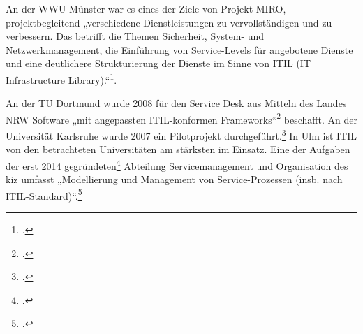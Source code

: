 An der WWU Münster war es eines der Ziele von Projekt MIRO, projektbegleitend „verschiedene Dienstleistungen zu vervollständigen und zu verbessern. Das betrifft die Themen Sicherheit, System- und Netzwerkmanagement, die Einführung von Service-Levels für angebotene Dienste und eine deutlichere Strukturierung der Dienste im Sinne von ITIL (IT Infrastructure Library).“\footcite{unimunster_projekt_miro_2015}.

An der TU Dortmund wurde 2008 für den Service Desk aus Mitteln des Landes NRW Software „mit angepassten ITIL-konformen Frameworks“\footcite{tudortmund_itmc_service_desk_2013} beschafft.
An der Universität Karlsruhe wurde 2007 ein Pilotprojekt durchgeführt.\footcite{grindler_itil_pilot_2007}
In Ulm ist ITIL von den betrachteten Universitäten am stärksten im Einsatz. Eine der Aufgaben der erst 2014 gegründeten\footcite{uniulm_abteilung_service_2014} Abteilung Servicemanagement und Organisation des kiz umfasst „Modellierung und Management von Service-Prozessen (insb. nach ITIL-Standard)“.\footcite{uniulm_abteilung_service_2014}
